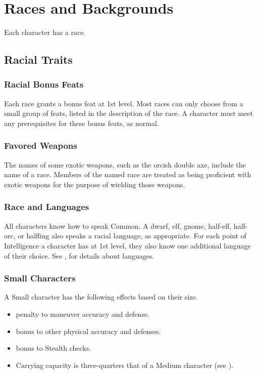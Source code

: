 \chapter{Races and Backgrounds}

Each character has a race.

\section{Racial Traits}

\subsection{Racial Bonus Feats}
Each race grants a bonus feat at 1st level. Most races can only choose from a small group of feats, listed in the description of the race. A character must meet any prerequisites for these bonus feats, as normal.

\subsection{Favored Weapons}
The names of some exotic weapons, such as the orcish double axe, include the name of a race. Members of the named race are treated as being proficient with exotic weapons for the purpose of wielding those weapons.

\subsection{Race and Languages}
All characters know how to speak Common. A dwarf, elf, gnome, half-elf, half-orc, or halfling also speaks a racial language, as appropriate. For each point of Intelligence a character has at 1st level, they also know one additional language of their choice. See , for details about languages.

\subsection{Small Characters}\label{Small Characters}
A Small character has the following effects based on their size.
  \begin{itemize} 
    \item {} penalty to maneuver accuracy and defense.
    \item {} bonus to other physical accuracy and defenses.
    \item {} bonus to Stealth checks.
    \item Carrying capacity is three-quarters that of a Medium character (see ).
  \end{itemize}

